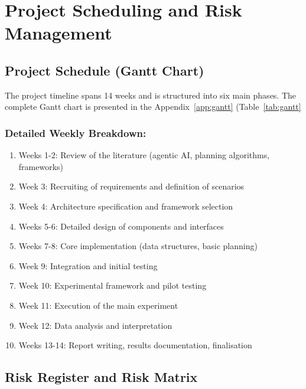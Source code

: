 \documentclass[12pt]{article}
\begin{document}
\section{Project Scheduling and Risk Management}
\label{proj_sched_risk_mgt}
\subsection{Project Schedule (Gantt Chart)}
The project timeline spans 14 weeks and is structured into six main phases.
The complete Gantt chart is presented in the Appendix~\ref{app:gantt} (Table~\ref{tab:gantt}


\subsubsection{Detailed Weekly Breakdown:}
\begin{enumerate}
    \item Weeks 1-2: Review of the literature (agentic AI, planning algorithms, frameworks)
    \item Week 3: Recruiting of requirements and definition of scenarios
    \item Week 4: Architecture specification and framework selection
    \item Weeks 5-6: Detailed design of components and interfaces
    \item Weeks 7-8: Core implementation (data structures, basic planning)
    \item Week 9: Integration and initial testing
    \item Week 10: Experimental framework and pilot testing
    \item Week 11: Execution of the main experiment
    \item Week 12: Data analysis and interpretation
    \item Weeks 13-14: Report writing, results documentation, finalisation
\end{enumerate}
\subsection{Risk Register and Risk Matrix}
\end{document}
